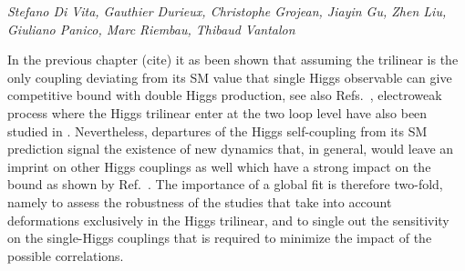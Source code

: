 \begin{center}
	\textit{Stefano Di Vita, Gauthier Durieux, Christophe Grojean, Jiayin Gu, Zhen Liu, Giuliano Panico, Marc Riembau, Thibaud Vantalon}
\end{center} 

In the previous chapter (cite) it as been shown that assuming the trilinear is the only coupling deviating from its SM value that single Higgs observable can give competitive bound with double Higgs production, see also Refs.~\cite{Gorbahn:2016uoy,Degrassi:2016wml,Bizon:2016wgr,Degrassi:2017ucl,Maltoni:2017ims}, electroweak process where the Higgs trilinear enter at the two loop level have also been studied in \cite{Kribs:2017znd}. Nevertheless, departures of the Higgs self-coupling from its SM prediction signal the existence of new dynamics that, in general, would leave an imprint on other Higgs couplings as well which have a strong impact on the bound as shown by Ref.~\cite{DiVita:2017eyz}. The importance of a global fit is therefore two-fold, namely to assess the robustness of the studies that take into account deformations exclusively in the Higgs trilinear, and to single out the sensitivity on the single-Higgs couplings that is required to minimize the impact of the possible correlations.



\medskip

